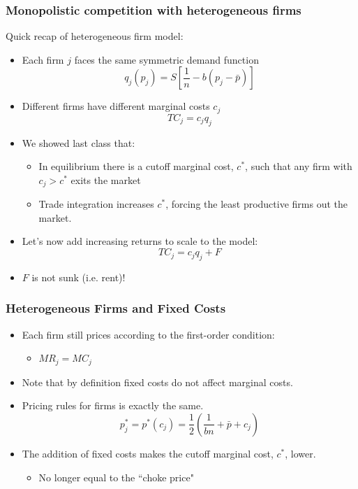 \documentclass{beamer}
\begin{document}
\begin{frame}
	\frametitle{Monopolistic competition with heterogeneous firms}

Quick recap of heterogeneous firm model:
	\begin{itemize}
		\item Each firm $j$ faces the same symmetric demand function
		\begin{equation}
		q_j(p_j)=S\left[\frac{1}{n} - b\left(p_j -\bar{p} \right)\right] \nonumber
		\end{equation}
	\item Different firms have different marginal costs $c_j$
		\begin{equation}
		TC_j = c_jq_j \nonumber
		\end{equation}
	\item We showed last class that:
		\begin{itemize}
		\item In equilibrium there is a cutoff marginal cost, $c^*$, such that any firm with $c_j>c^*$ exits the market
		\item Trade integration increases $c^*$, forcing the least productive firms out the market.
		\end{itemize}
	\item Let's now add increasing returns to scale to the model:
			\begin{equation}
			TC_j = c_jq_j + F \nonumber
			\end{equation}
	\item $F$ is not sunk (i.e. rent)!
		
	\end{itemize}

\end{frame}

\begin{frame}
	\frametitle{Heterogeneous Firms and Fixed Costs}

\begin{itemize}
		\item Each firm still prices according to the first-order condition:
		\begin{itemize}
			\item $MR_j=MC_j$
		\end{itemize}
		\item Note that by definition fixed costs do not affect marginal costs.
		\item Pricing rules for firms is exactly the same.
				\begin{equation}
				p_j^*=p^*(c_j)=\frac{1}{2}\left(\frac{1}{bn}+\bar{p} + c_j\right) \nonumber 
				\end{equation}
		\item The addition of fixed costs makes the cutoff marginal cost, $c^*$, lower. 
			\begin{itemize}
				\item No longer equal to the ``choke price"
			\end{itemize}
\end{itemize}
\end{frame}
\end{document}

